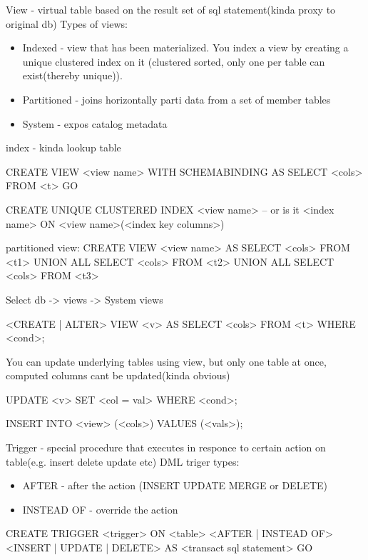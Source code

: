 \documentclass{article}
\begin{document}
    View - virtual table based on the result set of sql statement(kinda proxy to original db)
    Types of views:
    \begin{itemize}
        \item Indexed - view that has been materialized.
            You index a view by creating a unique clustered index on it
            (clustered \approx sorted, only one per table can exist(thereby unique)).
        \item Partitioned - joins horizontally parti data from a set of member tables
        \item System - expos catalog metadata
    \end{itemize}

    index - kinda lookup table

    CREATE VIEW <view name>
    WITH SCHEMABINDING AS
    SELECT <cols>
    FROM <t>
    GO

    CREATE UNIQUE CLUSTERED INDEX <view name> -- or is it <index name>
    ON <view name>(<index key columns>)

    partitioned view:
    CREATE VIEW <view name>
    AS
            SELECT <cols>
            FROM <t1>
        UNION ALL
            SELECT <cols>
            FROM <t2>
        UNION ALL
            SELECT <cols>
            FROM <t3>

    Select db -> views -> System views

    <CREATE | ALTER> VIEW <v> AS
    SELECT <cols>
    FROM <t>
    WHERE <cond>;

    You can update underlying tables using view, but only one table at once, computed columns cant be updated(kinda obvious)

    UPDATE <v>
    SET <col = val>
    WHERE <cond>;

    INSERT INTO <view> (<cols>)
    VALUES (<vals>);

    Trigger - special procedure that executes in responce to certain action on table(e.g. insert delete update etc)
    DML triger types:
    \begin{itemize}
        \item AFTER - after the action (INSERT UPDATE MERGE or DELETE)
        \item INSTEAD OF - override the action
    \end{itemize}
    
    CREATE TRIGGER <trigger>
    ON <table>
    <AFTER | INSTEAD OF> <INSERT | UPDATE | DELETE>
    AS <transact sql statement>
    GO
\end{document}

